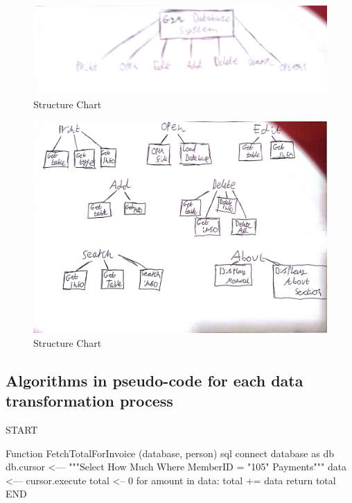 \begin{figure}[H]
    \includegraphics[width=\textwidth]{StructureChart1.jpg}
    \caption{Structure Chart} \label{fig:StructureChart}
\end{figure}

\begin{figure}[H]
    \includegraphics[width=\textwidth]{StructureChart2.jpg}
    \caption{Structure Chart} \label{fig:StructureChart}
\end{figure}



\subsection{Algorithms in pseudo-code for each data transformation process}

\begin{python}

START

Function FetchTotalForInvoice (database, person)
    sql connect database as db
    db.cursor <--- """Select How Much Where MemberID = "105" Payments"""
    data <--- cursor.execute
    total <-- 0
    for amount in data:
        total += data
    return total
END

\end{python}


